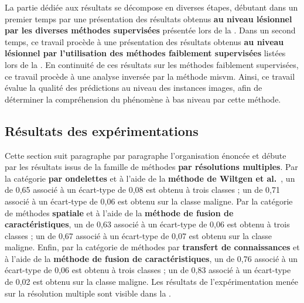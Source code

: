 La partie dédiée aux résultats se décompose en diverses étapes, débutant dans un premier temps par une présentation des résultats obtenus \textbf{au niveau lésionnel par les diverses méthodes supervisées} présentée lors de la . Dans un second temps, ce travail procède à une présentation des résultats obtenus \textbf{au niveau lésionnel par l'utilisation des méthodes faiblement supervisées} listées lors de la . En continuité de ces résultats sur les méthodes faiblement supervisées, ce travail procède à une analyse inversée par la méthode \gls{misvm}. Ainsi, ce travail évalue la qualité des prédictions au niveau des instances images, afin de déterminer la compréhension du phénomène à bas niveau par cette méthode.\par

\subsection{Résultats des expérimentations}
Cette section suit paragraphe par paragraphe l'organisation énoncée et débute par les résultats issus de la famille de méthodes \textbf{par résolutions multiples}. Par la catégorie \textbf{par ondelettes} et à l'aide de la \textbf{méthode de Wiltgen et al.}~\cite{Wiltgen2008}, un \fscore{} de 0,65 associé à un écart-type de 0,08 est obtenu à trois classes ; un \fscore{} de 0,71 associé à un écart-type de 0,06 est obtenu sur la classe maligne. Par la catégorie de méthodes \textbf{spatiale} et à l'aide de la \textbf{méthode de fusion de caractéristiques}, un \fscore{} de 0,63 associé à un écart-type de 0,06 est obtenu à trois classes ; un \fscore{} de 0,67 associé à un écart-type de 0,07 est obtenu sur la classe maligne. Enfin, par la catégorie de méthodes par \textbf{transfert de connaissances} et à l'aide de la \textbf{méthode de fusion de caractéristiques}, un \fscore{} de 0,76 associé à un écart-type de 0,06 est obtenu à trois classes ; un \fscore{} de 0,83 associé à un écart-type de 0,02 est obtenu sur la classe maligne. Les résultats de l'expérimentation menée sur la résolution multiple sont visible dans la .\par

